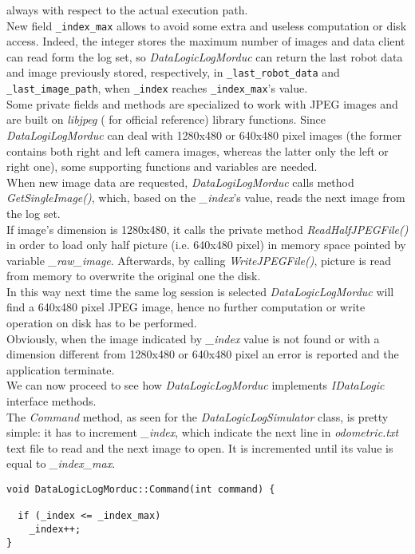 always with respect to the actual execution path.
\\
New field \texttt{\_index\_max} allows to avoid some extra and
useless computation or disk access. Indeed, the integer stores
the maximum number
of images and data client can read form the log set, so
\textit{DataLogicLogMorduc}  can
return the last robot data and image previously stored, respectively,
in \texttt{\_last\_robot\_data} and \texttt{\_last\_image\_path},
when \texttt{\_index}
reaches \texttt{\_index\_max}'s value.
\\
Some private fields and methods are specialized to work with JPEG
images and are built on \textit{libjpeg} (\cite{library:libjpeg}
for official reference) library functions.
Since \textit{DataLogiLogMorduc} can deal with 1280x480
or 640x480 pixel images (the former contains both right and left
camera images, whereas the latter only the left or right one),
some supporting functions and variables are needed.
\\
When new image data are requested, \textit{DataLogiLogMorduc}
calls method \textit{GetSingleImage()}, which, based on the
\textit{\_index}'s value, reads the next image from the log set.
\\
If image's dimension is 1280x480, it calls the private method
\textit{ReadHalfJPEGFile()} in order to load only half 
picture (i.e. 640x480 pixel) in memory space pointed by variable
\textit{\_raw\_image}. Afterwards, by calling \textit{WriteJPEGFile()},
picture is read from memory to overwrite the original one the disk.
\\
In this way next time the same log session is selected \textit{DataLogicLogMorduc}
will find a 640x480 pixel JPEG image, hence no further computation
or write operation on disk has to be performed.
\\
Obviously, when the image indicated by \textit{\_index} value is
not found or with a dimension different from 1280x480 or
640x480 pixel an error is reported and the application terminate.
\\
We can now proceed to see how \textit{DataLogicLogMorduc} implements
\textit{IDataLogic} interface methods.
\\
The \textit{Command} method, as seen for the \textit{DataLogicLogSimulator}
class, is pretty simple: it has to increment \textit{\_index},
which indicate the next line in \textit{odometric.txt}
text file to read and the next image to open. It is incremented until
its value is equal to \textit{\_index\_max}.
\\
\begin{lstlisting}[caption={\texttt{DataLogicLogMorduc::Command() method}},
    label={code:datalogiclogmorduc:command}]
void DataLogicLogMorduc::Command(int command) {

  if (_index <= _index_max)
    _index++;
}
\end{lstlisting}

